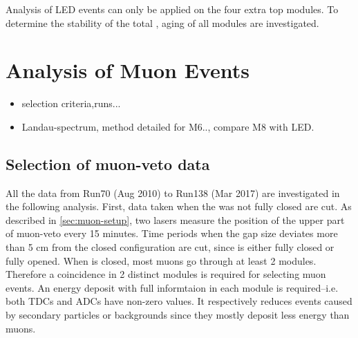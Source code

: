 Analysis of LED events can only be applied on the four extra top modules. To determine the stability of the total \mvs, aging of all modules are investigated. %

\section{Analysis of Muon Events}


\begin{itemize}
  \item selection criteria,runs...
  \item Landau-spectrum, method detailed for M6..,   compare M8 with LED.
\end{itemize}

\subsection{Selection of muon-veto data}
All the data from Run70 (Aug 2010) to Run138 (Mar 2017) are investigated in the following analysis. First, data taken when the \mvs was not fully closed are cut. As described in \ref{sec:muon-setup}, two lasers measure the position of the upper part of muon-veto every 15 minutes. Time periods when the gap size deviates more than 5 cm from the closed configuration are cut, since \mvs is either fully closed or fully opened.
When \mvs is closed, most muons go through at least 2 modules. Therefore a coincidence in 2 distinct modules is required for selecting muon events.  An energy deposit with full informtaion in each module is required--i.e. both TDCs and ADCs have non-zero values.
It respectively reduces events caused by secondary particles or backgrounds since they mostly deposit less energy than muons.

\subsection{ }


